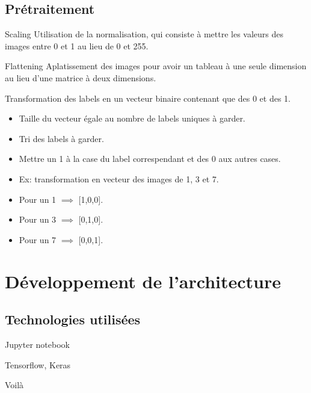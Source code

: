 \documentclass[10pt,handout]{beamer}
\begin{document}
\subsection{Prétraitement}
\begin{block}{Scaling}
    Utilisation de la normalisation, qui consiste à
    mettre les valeurs des images entre 0 et 1 au lieu de 0 et 255.
\end{block}
\begin{block}{Flattening}
    Aplatissement des images pour avoir un tableau à une seule dimension au lieu d’une matrice à deux dimensions.
\end{block}
\begin{block}{}
    Transformation des labels en un vecteur binaire contenant que des 0 et des 1.
    \begin{itemize}
        \item Taille du vecteur égale au nombre de labels uniques à garder.
        \item Tri des labels à garder.
        \item Mettre un 1 à la case du label correspendant
        et des 0 aux autres cases.
        \item Ex: transformation en vecteur des images de 1, 3 et 7.
        \item Pour un 1 $\implies$ [1,0,0].
        \item Pour un 3 $\implies$ [0,1,0].
        \item Pour un 7 $\implies$ [0,0,1].
    \end{itemize}
\end{block}

\section{Développement de l’architecture}
\subsection{Technologies utilisées}
\begin{frame}{Jupyter notebook}
    
\end{frame}

\begin{frame}{Tensorflow, Keras}
    
\end{frame}

\begin{frame}{Voilà}
    
\end{frame}
\end{document}
